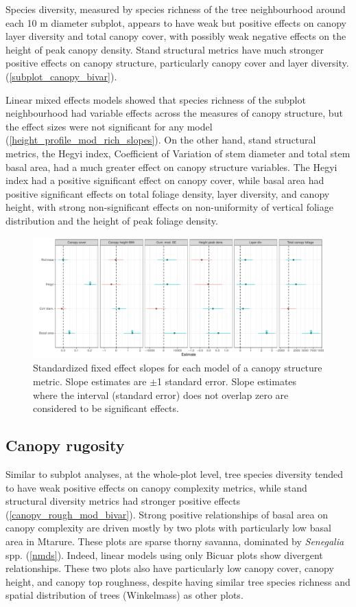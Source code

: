 \documentclass[11pt,a4paper]{article}
\begin{document}
Species diversity, measured by species richness of the tree neighbourhood around each 10 m diameter subplot, appears to have weak but positive effects on canopy layer diversity and total canopy cover, with possibly weak negative effects on the height of peak canopy density. Stand structural metrics have much stronger positive effects on canopy structure, particularly canopy cover and layer diversity. (\autoref{subplot_canopy_bivar}).

Linear mixed effects models showed that species richness of the subplot neighbourhood had variable effects across the measures of canopy structure, but the effect sizes were not significant for any model (\autoref{height_profile_mod_rich_slopes}). On the other hand, stand structural metrics, the Hegyi index, Coefficient of Variation of stem diameter and total stem basal area, had a much greater effect on canopy structure variables. The Hegyi index had a positive significant effect on canopy cover, while basal area had positive significant effects on total foliage density, layer diversity, and canopy height, with strong non-significant effects on non-uniformity of vertical foliage distribution and the height of peak foliage density.

\begin{figure}[H]
\centering
	\includegraphics[width=\textwidth]{height_profile_mod_rich_slopes}
	\caption{Standardized fixed effect slopes for each model of a canopy structure metric. Slope estimates are $\pm$1 standard error. Slope estimates where the interval (standard error) does not overlap zero are considered to be significant effects.}
	\label{height_profile_mod_rich_slopes}
\end{figure}

\subsection{Canopy rugosity}

Similar to subplot analyses, at the whole-plot level, tree species diversity tended to have weak positive effects on canopy complexity metrics, while stand structural diversity metrics had stronger positive effects (\autoref{canopy_rough_mod_bivar}). Strong positive relationships of basal area on canopy complexity are driven mostly by two plots with particularly low basal area in Mtarure. These plots are sparse thorny savanna, dominated by \textit{Senegalia} spp. (\autoref{nmds}). Indeed, linear models using only Bicuar plots show divergent relationships. These two plots also have particularly low canopy cover, canopy height, and canopy top roughness, despite having similar tree species richness and spatial distribution of trees (Winkelmass) as other plots.
\end{document}
